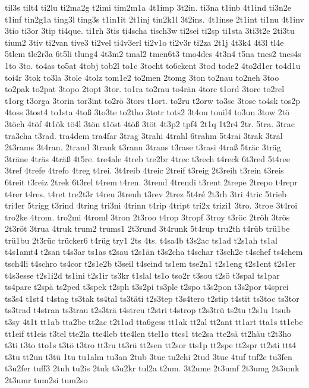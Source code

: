 {til3s
tilt4
ti2lu
ti2ma2g
t2imi
tim2m1a
4t1imp
3t2in.
ti3na
t1inb
4t1ind
ti3n2e
t1inf
tin2g1a
ting3l
ting3s
t1in1it
2t1inj
tin2k1l
3t2ins.
4t1inse
2t1int
ti1nu
4t1inv
3tio
ti3or
3tip
ti4que.
ti1rh
3tis
ti4scha
tisch3w
ti2sei
ti2sp
ti1sta
3ti3t2e
2ti3tu
tium2
3tiv
ti2van
tive3
ti2vel
ti4v3erl
ti2v1o
ti2v3r
ti2za
2t1j
4t3k4
4t3l
tl4e
5tlem
tle2r3a
6t5li
tlung4
4t3m2
tmal2
tmen6t3
tmo4des
4t3n4
t5na
tnes2
tnes4s
1to
3to.
to4as
to5at
4tobj
tob2l
to1c
3tocht
to6ckent
3tod
tode2
4to2d1er
to4d1u
toi4r
3tok
to3la
3tole
4tolz
tom1e2
to2men
2tomg
3ton
to2nau
to2neh
3too
to2pak
to2pat
3topo
2topt
3tor.
to1ra
to2rau
to4rän
4torc
t1ord
3tore
to2rel
t1org
t3orga
3torin
tor3int
to2rö
3tors
t1ort.
to2ru
t2orw
to3sc
3tose
to4sk
tos2p
4toss
3tost4
to1sta
4toß
3to3te
to2tho
3totr
tots2
3t4ou
touil4
to3un
3tow
2tö
3töch
4töf
4t1ök
tö4l
3tön
t1öst
4töß
3töt
4t3p2
tpf4
2t1q
1t2r4
2tr.
5tra.
3trac
tra3cha
t3rad.
tra4dem
tra4far
3trag
3trahi
4trahl
6trahm
5t4rai
3trak
3tral
2t3rams
3t4ran.
2trand
3trank
t3rann
3trans
t3rase
t3rasi
4traß
5träc
3träg
3träne
4träs
4träß
4t5re.
tre4ale
4treb
tre2br
4trec
t3rech
t4reck
6t3red
5t4ree
3tref
4trefe
4trefo
4treg
t4rei.
3t4reib
4treic
2treif
t3reig
2t3reih
t3rein
t3reis
6treit
t3reiz
2trek
6t3rel
t4rem
t4ren.
3trend
4trendi
t3rent
2trepe
2trepo
t4repr
t4rer
t4res.
t4ret
tre2t3r
t4reu
3treuh
t3rev
2trez
5t4ré
2t3rh
3tri
4tric
5trieb
tri4er
5trigg
t3rind
4tring
tri3ni
4trinn
t4rip
4tript
tri2x
trizi1
3tro.
3troe
3t4roi
tro2ke
4trom.
tro2mi
4troml
3tron
2t3roo
t4rop
3tropf
3troy
t3röc
2tröh
3trös
2t3röt
3trua
4truk
trum2
trums1
2t3rund
3t4runk
5t4rup
tru2th
t4rüb
trü1be
trü1bu
2t3rüc
trücker6
t4rüg
try1
2ts
4ts.
t4sa4b
t3s2ac
ts1ad
t2s1ah
ts1al
t4s1amt4
t2san
t4s3ar
ts1as
t2sau
t2s1än
t3s2cha
t4schar
t3sch2e
t4schef
ts4chem
tsch4li
t4schro
ts4cor
t2s1e2b
t3seil
t4seind
ts1em
tse2n1
t2s1eng
t2s1ent
t2s1er
t4s3esse
t2s1i2d
ts1ini
t2s1ir
ts3kr
t1slal
ts1o
tso2r
t3sou
t2sö
t3spal
ts1par
ts4pare
t2spä
ts2ped
t3spek
t2sph
t3s2pi
ts3ple
t2spo
t3s2pon
t3s2por
t4sprei
ts3s4
t1st4
t4stag
ts3tak
ts4tal
ts3täti
t2s3tep
t3s4tero
t2stip
t4stit
ts3toc
ts3tor
ts3trad
t4stran
ts3trau
t2s3trä
t4streu
t2stri
t4strop
t2s3trü
ts2tu
t2s1u
1tsub
t3sy
4t1t
tt1ab
tta2be
tt2ac
t2t1ad
tta6gess
tt1ak
tt2al
tt2ant
tt1art
tta1s
tt1ebe
tt1eif
tt1eis
t3tel
tte2la
tte4leb
tte4len
ttel1o
ttes1
tte2sa
tte2sä
tt2häu
t2t3ho
t3ti
t3to
tto1s
t3tö
t3tro
tt3ru
tt3rü
tt2sen
tt2sor
tts1p
tt2spe
tt2spr
tt2sti
ttt4
t3tu
tt2un
t3tü
1tu
tu1alm
tu3an
2tub
3tuc
tu2chi
2tud
3tue
4tuf
tuf2e
tu3fen
t3u2fer
tuff3
2tuh
tu2is
2tuk
t3u2kr
tul2a
t2um.
3t2ume
2t3umf
2t3umg
2t3umk
2t3umr
tum2si
tum2so
}
